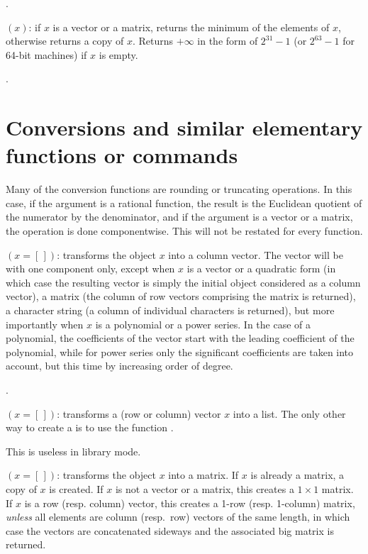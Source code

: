 .

$(x)$: if $x$ is a vector or a matrix, returns the minimum
of the elements of $x$, otherwise returns a copy of $x$. Returns $+\infty$
in the form of $2^{31}-1$ (or $2^{63}-1$ for 64-bit machines) if $x$ is empty.

.

\section{Conversions and similar elementary functions or commands}
\label{se:conversion}

\noindent
Many of the conversion functions are rounding or truncating operations. In
this case, if the argument is a rational function, the result is the
Euclidean quotient of the numerator by the denominator, and if the argument
is a vector or a matrix, the operation is done componentwise. This will not
be restated for every function.

$({x=[\,]})$: transforms the object $x$ into a column vector.
The vector will be with one component only, except when $x$ is a
vector or a quadratic form (in which case the resulting vector is simply the
initial object considered as a column vector), a matrix (the column of row
vectors comprising the matrix is returned), a character string (a column of
individual characters is returned), but more importantly when $x$ is a
polynomial or a power series. In the case of a polynomial, the coefficients
of the vector start with the leading coefficient of the polynomial, while for
power series only the significant coefficients are taken into account, but
this time by increasing order of degree.

.

$({x=[\,]})$: transforms a (row or column) vector $x$
into a list. The only other way to create a  is to use the
function .

This is useless in library mode.

$({x=[\,]})$: transforms the object $x$ into a matrix.
If $x$ is already a matrix, a copy of $x$ is created.
If $x$ is not a vector or a matrix, this creates a $1\times 1$ matrix.
If $x$ is a row (resp. column) vector, this creates a 1-row (resp.
1-column) matrix, \emph{unless} all elements are column (resp.~row) vectors
of the same length, in which case the vectors are concatenated sideways
and the associated big matrix is returned.

